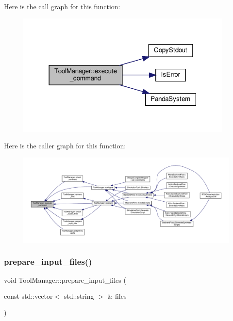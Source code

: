 Here is the call graph for this function\+:
\nopagebreak
\begin{figure}[H]
\begin{center}
\leavevmode
\includegraphics[width=307pt]{dc/dc5/classToolManager_aa19f7107e57fbb649f0418bc074c0736_cgraph}
\end{center}
\end{figure}
Here is the caller graph for this function\+:
\nopagebreak
\begin{figure}[H]
\begin{center}
\leavevmode
\includegraphics[width=350pt]{dc/dc5/classToolManager_aa19f7107e57fbb649f0418bc074c0736_icgraph}
\end{center}
\end{figure}
\mbox{\label{classToolManager_ac300930662a619e8d71346241f766d5a}} 
\subsubsection{\texorpdfstring{prepare\+\_\+input\+\_\+files()}{prepare\_input\_files()}}
{\footnotesize\ttfamily void Tool\+Manager\+::prepare\+\_\+input\+\_\+files (\begin{DoxyParamCaption}\item[{const std\+::vector$<$ std\+::string $>$ \&}]{files }\end{DoxyParamCaption})\hspace{0.3cm}{\ttfamily [protected]}}



